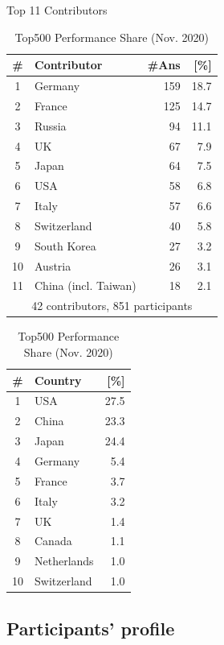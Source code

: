 \documentclass[preprint,5p,times]{elsarticle}
\def\Country{Contributor\xspace{}}%
\def\countries{contributors\xspace{}}%
\def\Countries{Contributors\xspace{}}%
\begin{document}
\begin{table}%
\begin{center}%
\caption{Top 11 \Countries}\label{tab:countries}%
\begin{tabular}{c|l|r|r}%
  \hline%
  \# & \Country & \#Ans & [\%] \\%
  \hline%
  1 & Germany 	& 159 & 18.7 \\%
  2 & France 	& 125 & 14.7 \\%
  3 & Russia 	& 94  & 11.1 \\%
  4 & UK 		& 67  &  7.9 \\%
  5 & Japan 	& 64  &  7.5 \\%
  6 & USA 	& 58  &  6.8 \\%
  7 & Italy 	& 57  &  6.6 \\%
  \hline%
  8 & Switzerland & 40  &  5.8 \\%
  9 & South Korea & 27  &  3.2 \\%
  10 & Austria 	& 26  &  3.1 \\%
  11 & China (incl. Taiwan) & 18 & 2.1 \\%
  \hline%
  \multicolumn{4}{c}{42 \countries, 851 participants} \\%
\end{tabular}%

\caption{Top500 Performance Share (Nov. 2020)}\label{tab:top500-share}%
  \begin{tabular}{c|l|r}%
    \hline%
    \# & Country & [\%] \\%
    \hline%
    1  & USA 	  & 27.5 \\%
    2  & China 	  & 23.3 \\%
    3  & Japan 	  & 24.4 \\%
    4  & Germany  &  5.4 \\%
    5  & France	  &  3.7 \\%
    6  & Italy	  &  3.2 \\%
    7  & UK	  &  1.4 \\%
    8  & Canada	  &  1.1 \\%
    9  & Netherlands  & 1.0 \\%
    10 & Switzerland  & 1.0 \\%
    \hline%
  \end{tabular}%
\end{center}%
\end{table}%

\subsection*{Participants' profile}
\end{document}
